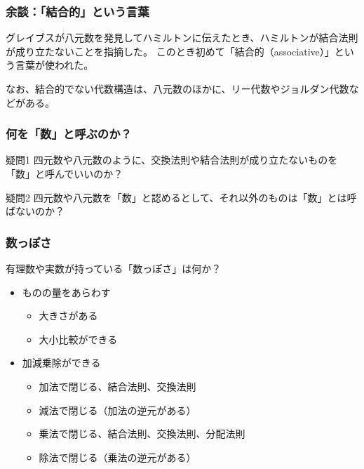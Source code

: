 \documentclass{beamer}
\begin{document}
\begin{frame}
    \frametitle{余談：「結合的」という言葉}

    グレイブスが八元数を発見してハミルトンに伝えたとき、ハミルトンが結合法則が成り立たないことを指摘した。
    このとき初めて「結合的（associative）」という言葉が使われた。

    \bigskip

    なお、結合的でない代数構造は、八元数のほかに、リー代数やジョルダン代数などがある。
\end{frame}

\begin{frame}
    \frametitle{何を「数」と呼ぶのか？}

    \begin{block}{疑問1}
        四元数や八元数のように、交換法則や結合法則が成り立たないものを「数」と呼んでいいのか？
    \end{block}

    \begin{block}{疑問2}
        四元数や八元数を「数」と認めるとして、それ以外のものは「数」とは呼ばないのか？
    \end{block}
\end{frame}

\begin{frame}
    \frametitle{数っぽさ}

    有理数や実数が持っている「数っぽさ」は何か？

    \begin{itemize}
        \item ものの量をあらわす
              \begin{itemize}
                  \item 大きさがある
                  \item 大小比較ができる
              \end{itemize}
        \item 加減乗除ができる
              \begin{itemize}
                  \item 加法で閉じる、結合法則、交換法則
                  \item 減法で閉じる（加法の逆元がある）
                  \item 乗法で閉じる、結合法則、交換法則、分配法則
                  \item 除法で閉じる（乗法の逆元がある）
              \end{itemize}
    \end{itemize}
\end{frame}
\end{document}
